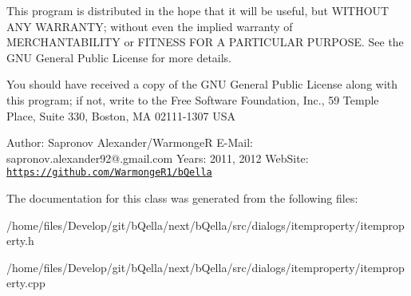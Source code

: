 This program is distributed in the hope that it will be useful, but WITHOUT ANY WARRANTY; without even the implied warranty of MERCHANTABILITY or FITNESS FOR A PARTICULAR PURPOSE. See the GNU General Public License for more details.

You should have received a copy of the GNU General Public License along with this program; if not, write to the Free Software Foundation, Inc., 59 Temple Place, Suite 330, Boston, MA 02111-\/1307 USA

Author: Sapronov Alexander/WarmongeR E-\/Mail: sapronov.alexander92@.gmail.com Years: 2011, 2012 WebSite: \href{https://github.com/WarmongeR1/bQella}{\tt https://github.com/WarmongeR1/bQella} 

The documentation for this class was generated from the following files:\begin{DoxyCompactItemize}
\item 
/home/files/Develop/git/bQella/next/bQella/src/dialogs/itemproperty/itemproperty.h\item 
/home/files/Develop/git/bQella/next/bQella/src/dialogs/itemproperty/itemproperty.cpp\end{DoxyCompactItemize}
